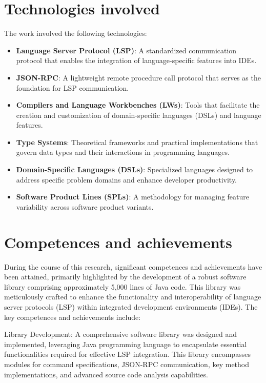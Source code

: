 \documentclass{adapt-lab}
\begin{document}
\section{Technologies involved}

The work involved the following technologies:
\begin{itemize}
    \item \textbf{Language Server Protocol (LSP)}: A standardized communication protocol that enables the integration of language-specific features into IDEs.
    \item \textbf{JSON-RPC}: A lightweight remote procedure call protocol that serves as the foundation for LSP communication.
    \item \textbf{Compilers and Language Workbenches (LWs)}: Tools that facilitate the creation and customization of domain-specific languages (DSLs) and language features.
    \item \textbf{Type Systems}: Theoretical frameworks and practical implementations that govern data types and their interactions in programming languages.
    \item \textbf{Domain-Specific Languages (DSLs)}: Specialized languages designed to address specific problem domains and enhance developer productivity.
    \item \textbf{Software Product Lines (SPLs)}: A methodology for managing feature variability across software product variants.
\end{itemize}

\section{Competences and achievements}

During the course of this research, significant competences and achievements have been attained, primarily highlighted by the development of a robust software library comprising approximately 5,000 lines of Java code. This library was meticulously crafted to enhance the functionality and interoperability of language server protocols (LSP) within integrated development environments (IDEs). The key competences and achievements include:

    Library Development: A comprehensive software library was designed and implemented, leveraging Java programming language to encapsulate essential functionalities required for effective LSP integration. This library encompasses modules for command specifications, JSON-RPC communication, key method implementations, and advanced source code analysis capabilities.
\end{document}
